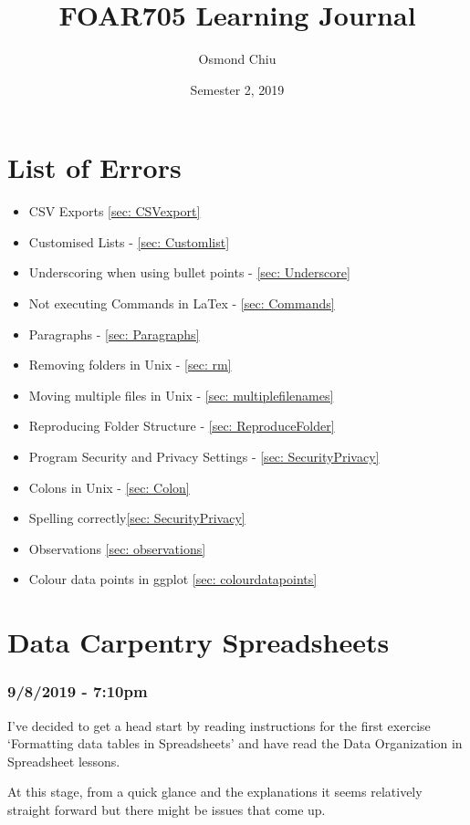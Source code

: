\documentclass{article}
\title{FOAR705 Learning Journal}
\author{Osmond Chiu}
\date{Semester 2, 2019}
\begin{document}
\maketitle
\tableofcontents
\newpage

\section{List of Errors}\par
\begin{itemize}
    \item CSV Exports \ref{sec: CSVexport}
    \item Customised Lists - \ref{sec: Customlist}
    \item Underscoring when using bullet points - \ref{sec: Underscore}
    \item Not executing Commands in LaTex - \ref{sec: Commands}
    \item Paragraphs - \ref{sec: Paragraphs}\par
    \item Removing folders in Unix - \ref{sec: rm}\par
    \item Moving multiple files in Unix - \ref{sec: multiplefilenames}\par
    \item Reproducing Folder Structure - \ref{sec: ReproduceFolder}
    \item Program Security and Privacy Settings - \ref{sec: SecurityPrivacy}
    \item Colons in Unix - \ref{sec: Colon}
    \item Spelling correctly\ref{sec: SecurityPrivacy}
    \item Observations \ref{sec: observations}
    \item Colour data points in ggplot \ref{sec: colourdatapoints}

\end{itemize}



\par


\newpage
\section{Data Carpentry Spreadsheets}
\subsubsection*{9/8/2019 - 7:10pm}
I’ve decided to get a head start by reading instructions for the first exercise ‘Formatting data tables in Spreadsheets’ and have read the Data Organization in Spreadsheet lessons.\par
At this stage, from a quick glance and the explanations it seems relatively straight forward but there might be issues that come up.\par
\end{document}
